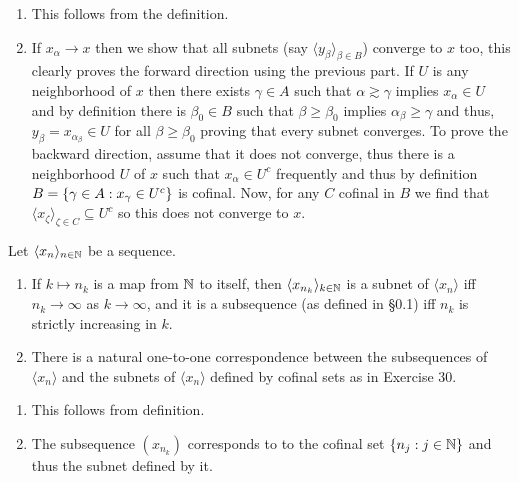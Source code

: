 \documentclass[12pt,a4paper]{article}
\begin{document}
\begin{solution}
\begin{enumerate}[label=\alph*.]
    \item This follows from the definition. 
    \item If $x_\alpha\to x$ then we show that all subnets (say $\langle y_\beta\rangle_{\beta\in B}$) converge to $x$ too, this clearly proves the forward direction using the previous part. 
        If $U$ is any neighborhood of $x$ then there exists $\gamma\in A$ such that $\alpha\gtrsim\gamma$ implies $x_\alpha\in U$ and by definition there is $\beta_0\in B$ such that $\beta\geq\beta_0$ implies $\alpha_\beta\geq\gamma$ and thus, $y_\beta=x_{\alpha_\beta}\in U$ for all $\beta\geq\beta_0$ proving that every subnet converges. 
        To prove the backward direction, assume that it does not converge, thus there is a neighborhood $U$ of $x$ such that $x_\alpha\in U^c$ frequently and thus by definition $B= \qty{\gamma\in A:x_\gamma\in U^c}$ is cofinal. 
        Now, for any $C$ cofinal in $B$ we find that $\langle x_\zeta\rangle_{\zeta\in C}\subseteq U^c$ so this does not converge to $x$. 
\end{enumerate}
\end{solution}
\begin{problem}\label{prob:4-31}
Let $\langle x_n \rangle_{n \in \mathbb{N}}$ be a sequence.
\begin{enumerate}[label=\alph*.]
    \item If $k \mapsto n_k$ is a map from $\mathbb{N}$ to itself, then $\langle x_{n_k} \rangle_{k \in \mathbb{N}}$ is a subnet of $\langle x_n \rangle$ iff $n_k \to \infty$ as $k \to \infty$, and it is a subsequence (as defined in \S 0.1) iff $n_k$ is strictly increasing in $k$.
    \item There is a natural one-to-one correspondence between the subsequences of $\langle x_n \rangle$ and the subnets of $\langle x_n \rangle$ defined by cofinal sets as in Exercise 30.
\end{enumerate}
\end{problem}
\begin{solution}
\begin{enumerate}[label=\alph*.]
    \item This follows from definition.
    \item The subsequence $(x_{n_k})$ corresponds to to the cofinal set $\{n_j:j\in\mathbb{N}\}$ and thus the subnet defined by it. 
\end{enumerate}
\end{solution}
\end{document}
